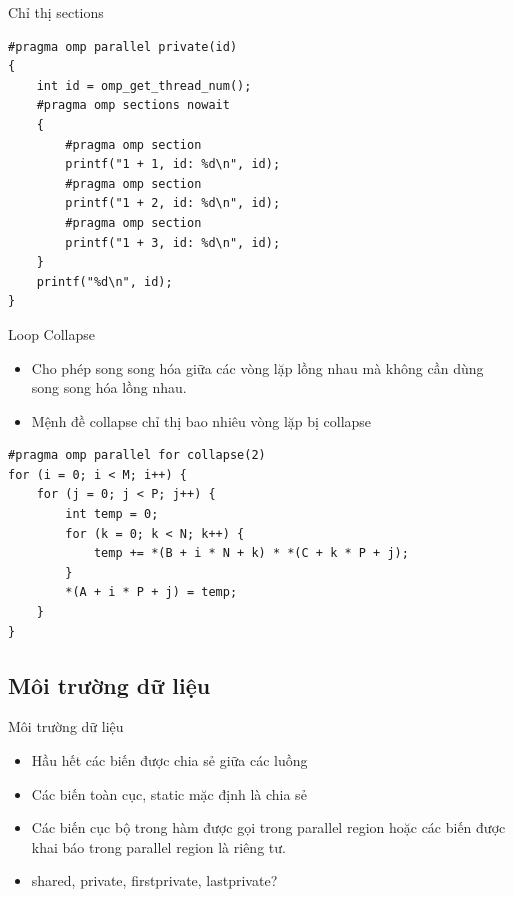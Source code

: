 \documentclass[10pt]{beamer}
\theoremstyle{remark}
\numberwithin{algocf}{section}
\numberwithin{equation}{section}
\numberwithin{dl}{section}
\numberwithin{figure}{section}
\begin{document}
\begin{frame}[fragile]{Chỉ thị sections}
    \begin{verbatim}
#pragma omp parallel private(id)
{
    int id = omp_get_thread_num();
    #pragma omp sections nowait
    {
        #pragma omp section
        printf("1 + 1, id: %d\n", id);
        #pragma omp section
        printf("1 + 2, id: %d\n", id);
        #pragma omp section
        printf("1 + 3, id: %d\n", id);
    }
    printf("%d\n", id);
}
    \end{verbatim}
\end{frame}

\begin{frame}[fragile]{Loop Collapse}
    \begin{itemize}
        \item Cho phép song song hóa giữa các vòng lặp lồng nhau mà không cần dùng song song hóa lồng nhau.
        \item Mệnh đề collapse chỉ thị bao nhiêu vòng lặp bị collapse
    \end{itemize}
    \begin{verbatim}
#pragma omp parallel for collapse(2)
for (i = 0; i < M; i++) {
    for (j = 0; j < P; j++) {
        int temp = 0;
        for (k = 0; k < N; k++) {
            temp += *(B + i * N + k) * *(C + k * P + j);
        }
        *(A + i * P + j) = temp;
    }
}
    \end{verbatim}
\end{frame}

\subsection{Môi trường dữ liệu}

\begin{frame}{Môi trường dữ liệu}
    \begin{itemize}
        \item Hầu hết các biến được chia sẻ giữa các luồng
        \item Các biến toàn cục, static mặc định là chia sẻ
        \item Các biến cục bộ trong hàm được gọi trong parallel region hoặc các biến được khai báo trong parallel region là riêng tư.
        \item shared, private, firstprivate, lastprivate?
    \end{itemize}
\end{frame}
\end{document}
